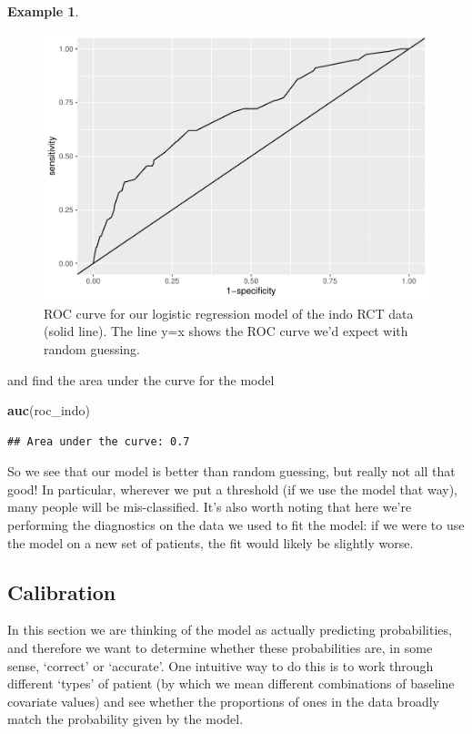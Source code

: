 \documentclass[
  openany]{book}
\newenvironment{Shaded}{\begin{snugshade}}{\end{snugshade}}
\newcommand{\FunctionTok}[1]{\textcolor[rgb]{0.13,0.29,0.53}{\textbf{#1}}}
\newcommand{\NormalTok}[1]{#1}
\theoremstyle{definition}
\theoremstyle{definition}
\newtheorem{example}{Example}[chapter]
\theoremstyle{definition}
\theoremstyle{definition}
\theoremstyle{remark}
\begin{document}
\begin{example}
\begin{figure}
\centering
\includegraphics{CT4H_notes_files/figure-latex/indoroc1-1.pdf}
\caption{\label{fig:indoroc1}ROC curve for our logistic regression model of the indo RCT data (solid line). The line y=x shows the ROC curve we'd expect with random guessing.}
\end{figure}

and find the area under the curve for the model

\begin{Shaded}
\begin{Highlighting}[]
\FunctionTok{auc}\NormalTok{(roc\_indo)}
\end{Highlighting}
\end{Shaded}

\begin{verbatim}
## Area under the curve: 0.7
\end{verbatim}

So we see that our model is better than random guessing, but really not all that good! In particular, wherever we put a threshold (if we use the model that way), many people will be mis-classified. It's also worth noting that here we're performing the diagnostics on the data we used to fit the model: if we were to use the model on a new set of patients, the fit would likely be slightly worse.
\end{example}

\subsection{Calibration}\label{calibration}

In this section we are thinking of the model as actually predicting probabilities, and therefore we want to determine whether these probabilities are, in some sense, `correct' or `accurate'. One intuitive way to do this is to work through different `types' of patient (by which we mean different combinations of baseline covariate values) and see whether the proportions of ones in the data broadly match the probability given by the model.
\end{document}

